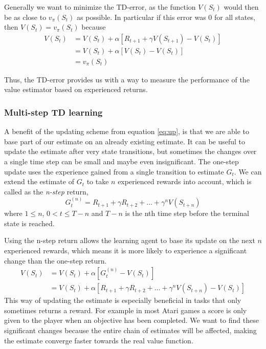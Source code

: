 \documentclass[11pt]{article}
\begin{document}
Generally we want to minimize the TD-error, as the function $V(S_t)$
would then be as close to $v_\pi(S_t)$ as possible.
In particular if this error was 0 for all states, then
$V(S_t) = v_\pi(S_t)$ because 
\begin{equation}
    \begin{aligned}
    V(S_t)  & = V(S_t) + \alpha  [R_{t+1} + \gamma  V(S_{t+1}) - V(S_t)]   \\
           & = V(S_t) + \alpha  [V(S_t) - V(S_t)]  \\
           & = v_\pi(S_t) 
    \end{aligned}
\end{equation}

Thus, the TD-error provides us with a way to measure the performance of
the value estimator based on experienced returns.

\subsubsection{Multi-step TD learning}\label{sec:multi}

A benefit of the updating scheme from equation \ref{eq:up}, is that we are able to base
part of our estimate on an already existing estimate.
It can be useful to update the estimate after very state transitions, but sometimes
the changes over a single time step can be small and maybe even insignificant.
The one-step update uses the experience gained from a single transition to
estimate $G_t$.
We can extend the estimate of $G_t$ to take $n$ experienced rewards
into account, which is called as the \textit{n-step} return,
\begin{equation}
    G^{(n)}_t = R_{t+1} + \gamma R_{t+2} + \dots + \gamma^n V(S_{t+n})
\end{equation}
where $1 \leq n$, $0 < t \leq T - n$ and $T - n$ is the nth time step before the terminal state
is reached.

Using the n-step return allows the learning agent to base its update on the next $n$ experienced
rewards, which means it is more likely to experience a significant change than the one-step return.
\begin{equation}
    \begin{aligned}    
        V(S_t) & = V(S_t) + \alpha [G^{(n)}_t - V(S_t)]\\
        & = V(S_t) + \alpha [R_{t+1} + \gamma R_{t+2} + \dots + \gamma^n V(S_{t+n}) - V(S_t)]
    \end{aligned}
\end{equation}
This way of updating the estimate is especially beneficial in tasks that only sometimes returns a reward. 
For example in most Atari games a score is only given to the player when an objective has been completed.
We want to find these significant changes because the entire chain of estimates 
will be affected, making the estimate converge faster towards the real value function.
\end{document}
